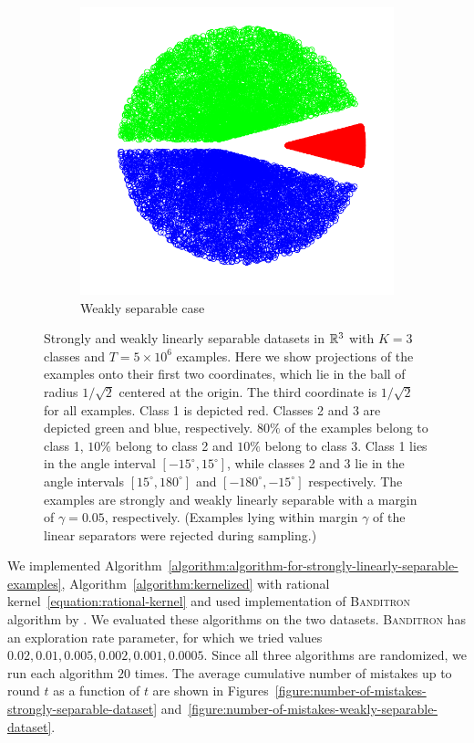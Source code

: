 \begin{figure}[h]
\begin{subfigure}[b]{0.3\textwidth}
\includegraphics[width=\textwidth, trim={0, 0cm, 0, 0}, clip]{figures/weak_points}
\caption{Weakly separable case}
\label{figure:weakly-separable-dataset}
\end{subfigure}
\caption{Strongly and weakly linearly separable datasets in $\mathbb{R}^3$ with $K=3$
classes and $T=5\times 10^6$ examples. Here we show projections of the examples
onto their first two coordinates, which lie in the ball of radius $1/\sqrt{2}$
centered at the origin. The third coordinate is $1/\sqrt{2}$ for all examples.
Class 1 is depicted red. Classes 2 and 3 are depicted green and blue,
respectively. $80\%$ of the examples belong to class 1, $10\%$ belong to class 2
and $10\%$ belong to class 3. Class 1 lies in the angle interval $[-15^\circ,
15^\circ]$, while classes 2 and 3 lie in the angle intervals $[15^\circ,
180^\circ]$ and $[-180^\circ, -15^\circ]$ respectively. The examples are
strongly and weakly linearly separable with a margin of $\gamma=0.05$,
respectively. (Examples lying within margin $\gamma$ of the linear separators
were rejected during sampling.)}
\label{figure:strongly-and-weakly-separable-datasets}
\end{figure}

We implemented
Algorithm~\ref{algorithm:algorithm-for-strongly-linearly-separable-examples},
Algorithm~\ref{algorithm:kernelized} with rational
kernel~\eqref{equation:rational-kernel} and used implementation of
\textsc{Banditron} algorithm by \citet{Orabona09}.%
We evaluated these algorithms on the two datasets. \textsc{Banditron} has an
exploration rate parameter, for which we tried values $0.02, 0.01, 0.005, 0.002,
0.001, 0.0005$. Since all three algorithms are randomized, we run each algorithm
$20$ times. The average cumulative number of mistakes up to round $t$ as a
function of $t$ are shown in
Figures~\ref{figure:number-of-mistakes-strongly-separable-dataset}
and~\ref{figure:number-of-mistakes-weakly-separable-dataset}.

